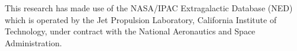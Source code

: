 \acknowledgements

This research has made use of the NASA/IPAC Extragalactic Database (NED) which is operated by the Jet Propulsion Laboratory, California Institute of Technology, under contract with the National Aeronautics and Space Administration. 



%





